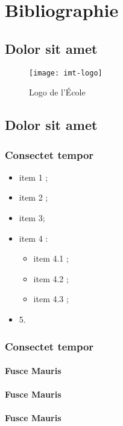 \section{Bibliographie}
\subsection{Dolor sit amet}
\lipsum[1]
\begin{wrapfigure}[15]{r}{6 cm}
	\centering
	\texttt{[image: imt-logo]}
	\caption{Logo de l'École}
\end{wrapfigure} \lipsum[1-5]

\subsection{Dolor sit amet}
\subsubsection{Consectet tempor}
\lipsum[1]
\begin{itemize}
	\item item 1 ;
	\item item 2 ;
	\item item 3;
	\item item 4 :
		\begin{itemize}
			\item item 4.1 ;
			\item item 4.2 ;
			\item item 4.3 ;
		\end{itemize}
	\item 5.
\end{itemize}
\lipsum[1]

\subsubsection{Consectet tempor}
\paragraph{Fusce Mauris}
\lipsum[1]
\paragraph{Fusce Mauris}
\lipsum[1]
\paragraph{Fusce Mauris}
\lipsum[1]

